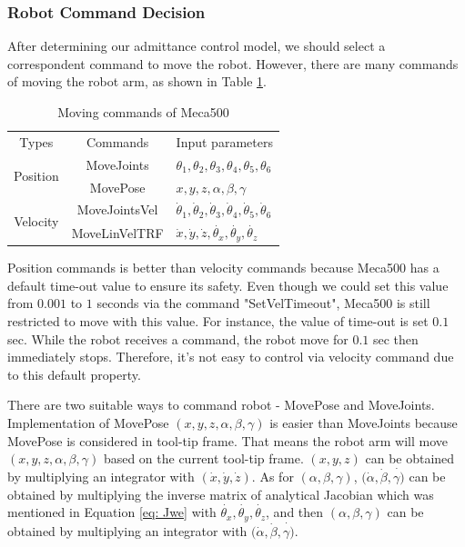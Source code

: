 \subsubsection{Robot Command Decision}
\hspace*{6mm}After determining our admittance control model, we should select a correspondent command to move the robot. However, there are many commands of moving the robot arm, as shown in Table \ref{tab:commands}.
\begin{table}[htbp]
\centering
\tabcolsep=20pt
\caption{Moving commands of Meca500}
\label{tab:commands}
\begin{tabular}{|c|c|l|} 
\hline
\rowcolor{lightgray}Types						&Commands			&Input parameters\\
\cline{1-3}
\multirow{2}{*}{Position}					&MoveJoints			&\noindent $\theta _1, \theta _2 ,\theta _3 ,\theta _4 ,\theta _5 , \theta _6 $\\\cline{2-3}
											&MovePose			&\noindent$x,y,z,\alpha ,\beta ,\gamma $\\
\cline{1-3}
\multirow{2}{*}{Velocity}					&MoveJointsVel		&$\dot{\theta}_1, \dot{\theta}_2, \dot{\theta}_3,\dot{\theta}_4, \dot{\theta}_5 , \dot{\theta}_6 $\\\cline{2-3}
											&MoveLinVelTRF		&$\dot{x},\dot{y},\dot{z},\dot{\theta _x},\dot{\theta _y},\dot{\theta _z}$\\
\hline
\end{tabular}
\end{table}
\par
Position commands is better than velocity commands because Meca500 has a default time-out value to ensure its safety. Even though we could set this value from $0.001$ to $1$ seconds  via the command "SetVelTimeout", Meca500 is still restricted to move with this value. For instance, the value of time-out is set $0.1$ sec. While the robot receives a command, the robot move for $0.1$ sec then immediately stops. Therefore, it's not easy to control via velocity command due to this default property.
\par
There are two suitable ways to command robot - MovePose and MoveJoints. Implementation of MovePose $(x,y,z,\alpha ,\beta ,\gamma)$ is easier than MoveJoints because MovePose is considered in tool-tip frame. That means the robot arm will move $(x,y,z,\alpha ,\beta ,\gamma)$ based on the current tool-tip frame.  $(x,y,z)$ can be obtained by multiplying an integrator with $(\dot{x},\dot{y},\dot{z})$. As for $(\alpha ,\beta ,\gamma)$, $(\dot{\alpha} ,\dot{\beta} ,\dot{\gamma)}$ can be obtained by multiplying the inverse matrix of analytical Jacobian which was mentioned in Equation \ref{eq: Jwe} with $\dot{\theta _x},\dot{\theta _y},\dot{\theta _z}$, and then $(\alpha ,\beta ,\gamma)$ can be obtained by multiplying an integrator with $(\dot{\alpha} ,\dot{\beta} ,\dot{\gamma)}$.
